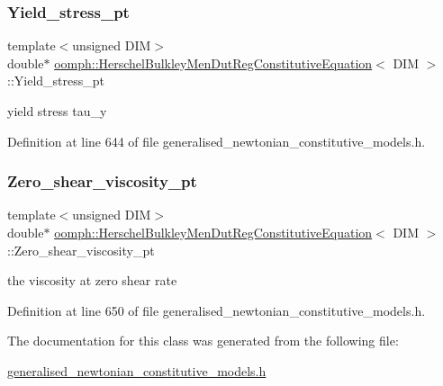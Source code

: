 \subsubsection{\texorpdfstring{Yield\+\_\+stress\+\_\+pt}{Yield\_stress\_pt}}
{\footnotesize\ttfamily template$<$unsigned D\+IM$>$ \\
double$\ast$ \hyperlink{classoomph_1_1HerschelBulkleyMenDutRegConstitutiveEquation}{oomph\+::\+Herschel\+Bulkley\+Men\+Dut\+Reg\+Constitutive\+Equation}$<$ D\+IM $>$\+::Yield\+\_\+stress\+\_\+pt\hspace{0.3cm}{\ttfamily [private]}}



yield stress tau\+\_\+y 



Definition at line 644 of file generalised\+\_\+newtonian\+\_\+constitutive\+\_\+models.\+h.

\mbox{\label{classoomph_1_1HerschelBulkleyMenDutRegConstitutiveEquation_abe037e5299047cce1ef25e2ea1aebe3f}} 
\subsubsection{\texorpdfstring{Zero\+\_\+shear\+\_\+viscosity\+\_\+pt}{Zero\_shear\_viscosity\_pt}}
{\footnotesize\ttfamily template$<$unsigned D\+IM$>$ \\
double$\ast$ \hyperlink{classoomph_1_1HerschelBulkleyMenDutRegConstitutiveEquation}{oomph\+::\+Herschel\+Bulkley\+Men\+Dut\+Reg\+Constitutive\+Equation}$<$ D\+IM $>$\+::Zero\+\_\+shear\+\_\+viscosity\+\_\+pt\hspace{0.3cm}{\ttfamily [private]}}



the viscosity at zero shear rate 



Definition at line 650 of file generalised\+\_\+newtonian\+\_\+constitutive\+\_\+models.\+h.



The documentation for this class was generated from the following file\+:\begin{DoxyCompactItemize}
\item 
\hyperlink{generalised__newtonian__constitutive__models_8h}{generalised\+\_\+newtonian\+\_\+constitutive\+\_\+models.\+h}\end{DoxyCompactItemize}
